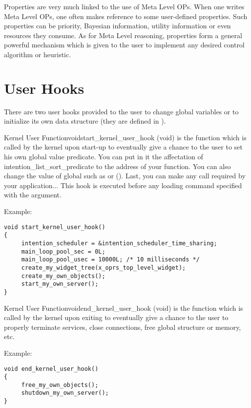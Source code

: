 Properties are very much linked to the use of Meta Level OPs. When one writes
Meta Level OPs, one often makes reference to some user-defined properties. Such
properties can be priority, Bayesian information, utility information or even
resources they consume. As for Meta Level reasoning, properties form a general
powerful mechanism which is given to the user to implement any desired control
algorithm or heuristic.

\section{User Hooks}

There are two user hooks provided to the user to change global variables or to
initialize its own data structure (they are defined in
).

\begin{typefn}{Kernel User Function}{void}{start\_kernel\_user\_hook} {(void)}
is the function which is called by the kernel upon start-up to eventually give
a chance to the user to set his own global value predicate. You can put in it
the affectation of intention\_list\_sort\_predicate to the address of your
function.  You can also change the value of global such as
 or  (). Last, you can make any call required by your application...  This
hook is executed before any loading command specified with the 
argument.

Example:
\begin{verbatim}
void start_kernel_user_hook()
{
     intention_scheduler = &intention_scheduler_time_sharing;
     main_loop_pool_sec = 0L;
     main_loop_pool_usec = 10000L; /* 10 milliseconds */
     create_my_widget_tree(x_oprs_top_level_widget);
     create_my_own_objects();
     start_my_own_server();
}
\end{verbatim}
\end{typefn}

\begin{typefn}{Kernel User Function}{void}{end\_kernel\_user\_hook} {(void)}
is the function which is called by the kernel upon exiting to eventually give a
chance to the user to properly terminate services, close connections, free
global structure or memory, etc.

Example:
\begin{verbatim}
void end_kernel_user_hook()
{
     free_my_own_objects();
     shutdown_my_own_server();
}
\end{verbatim}
\end{typefn}

